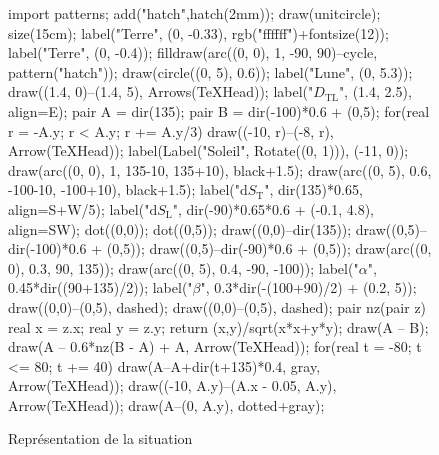 \documentclass[a4paper, 11pt]{article}
\begin{document}
	\begin{figure}[H]
		\centering
		\begin{asy}
			import patterns;
			add("hatch",hatch(2mm));
			draw(unitcircle);
			size(15cm);
			label("\colorbox{white}{Terre}", (0, -0.33), rgb("ffffff")+fontsize(12));
			label("Terre", (0, -0.4));
			filldraw(arc((0, 0), 1, -90, 90)--cycle, pattern("hatch"));
			draw(circle((0, 5), 0.6));
			label("Lune", (0, 5.3));
			draw((1.4, 0)--(1.4, 5), Arrows(TeXHead));
			label("$D_\mathrm{TL}$", (1.4, 2.5), align=E);
			pair A = dir(135);
			pair B = dir(-100)*0.6 + (0,5);
			for(real r = -A.y; r < A.y; r += A.y/3) {
				draw((-10, r)--(-8, r), Arrow(TeXHead));
			}
			label(Label("Soleil", Rotate((0, 1))), (-11, 0));
			draw(arc((0, 0), 1, 135-10, 135+10), black+1.5);
			draw(arc((0, 5), 0.6, -100-10, -100+10), black+1.5);
			label("$\mathrm{d}S_\mathrm{T}$", dir(135)*0.65, align=S+W/5);
			label("$\mathrm{d}S_\mathrm{L}$", dir(-90)*0.65*0.6 + (-0.1, 4.8), align=SW);
			dot((0,0)); dot((0,5));
			draw((0,0)--dir(135));
			draw((0,5)--dir(-100)*0.6 + (0,5));
			draw((0,5)--dir(-90)*0.6 + (0,5));
			draw(arc((0, 0), 0.3, 90, 135));
			draw(arc((0, 5), 0.4, -90, -100));
			label("$\alpha$", 0.45*dir((90+135)/2));
			label("$\beta$", 0.3*dir(-(100+90)/2) + (0.2, 5));
			draw((0,0)--(0,5), dashed);
			draw((0,0)--(0,5), dashed);
			pair nz(pair z) { real x = z.x; real y = z.y; return (x,y)/sqrt(x*x+y*y); }
			draw(A -- B);
			draw(A -- 0.6*nz(B - A) + A, Arrow(TeXHead));
			for(real t = -80; t <= 80; t += 40) {
				draw(A--A+dir(t+135)*0.4, gray, Arrow(TeXHead));
			}
			draw((-10, A.y)--(A.x - 0.05, A.y), Arrow(TeXHead));
			draw(A--(0, A.y), dotted+gray);
		\end{asy}
		\caption{Représentation de la situation}
	\end{figure}
\end{document}
